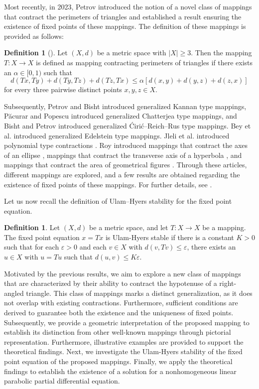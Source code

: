 \documentclass[11pt,reqno,a4paper]{amsart}
\theoremstyle{plain}
\theoremstyle{definition}
\newtheorem{definition}[theorem]{Definition}
\theoremstyle{remark}
\numberwithin{equation}{section}
\begin{document}
Most recently, in 2023, Petrov \cite{P23} introduced the notion of a novel class of mappings that contract the perimeters of triangles and established a result ensuring the existence of fixed points of these mappings. The definition of these mappings is provided as follows:
\begin{definition}[\cite{P23}]\label{D11}
Let $(X,d)$ be a metric space with $|X|\ge 3$. Then the mapping $T:X \to X$ is defined as mapping contracting perimeters of triangles if there exists an $\alpha \in [0,1)$ such that 
\begin{equation}\label{cpt}
d(Tx,Ty) +d(Ty,Tz) + d(Tz,Tx) 
\le \alpha [d(x,y) +d(y,z) + d(z,x)]
\end{equation}
for every three pairwise distinct points $x,y,z \in X$.
\end{definition}

Subsequently, Petrov and Bisht \cite{PB24} introduced generalized Kannan type mappings, P{\u{a}}curar and Popescu \cite{PP24} introduced generalized Chatterjea type mappings, and Bisht and Petrov \cite{BP24} introduced generalized Ćirić–Reich–Rus type mappings. Bey et al. \cite{BPS25} introduced generalized Edelstein type mappings. Jleli et al. introduced polynomial type contractions \cite{JPS25}. Roy introduced mappings that contract the axes of an ellipse \cite{R24}, mappings that contract the transverse axis of a hyperbola \cite{R26b}, and mappings that contract the area of geometrical figures \cite{R26a}. Through these articles, different mappings are explored, and a few results are obtained regarding the existence of fixed points of these mappings. For further details, see \cite{BMD2,BMD1,BMD3,BMDS26}.

\medskip
Let us now recall the definition of Ulam–Hyers stability for the fixed point equation.
\begin{definition}\cite{H41}
    Let $(X, d)$ be a metric space, and let $T:X \to X$ be a mapping. The fixed point equation $x=Tx$ is Ulam-Hyers stable if there is a constant $K > 0$ such that for each $\varepsilon >0$ and each $v \in X$ with $d(v,Tv) \leq \varepsilon$, there exists an $u \in X$ with $u=Tu$ such that $d(u,v) \leq K \varepsilon$.
\end{definition}
    
Motivated by the previous results, we aim to explore a new class of mappings that are characterized by their ability to contract the hypotenuse of a right-angled triangle. This class of mappings marks a distinct generalization, as it does not overlap with existing contractions. Furthermore, sufficient conditions are derived to guarantee both the existence and the uniqueness of fixed points. Subsequently, we provide a geometric interpretation of the proposed mapping to establish its distinction from other well-known mappings through pictorial representation. Furthermore, illustrative examples are provided to support the theoretical findings. Next, we investigate the Ulam-Hyers stability of the fixed point equation of the proposed mappings. Finally, we apply the theoretical findings to establish the existence of a solution for a nonhomogeneous linear parabolic partial differential equation. 
\end{document}
